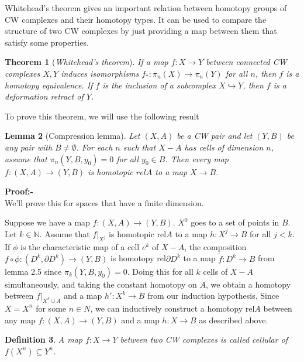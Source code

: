 \documentclass[12pt]{extarticle}
\newcounter{pic}[page]
\numberwithin{equation}{section}
\newtheorem{thm}{Theorem}[section]
\newtheorem{lem}[thm]{Lemma}
\newtheorem{defn}[thm]{Definition}
\newenvironment{Proof}[1]
    {\begin{mdframed}\textbf{#1} \\}
    {\end{mdframed}}
\newcommand{\N}{\mathbb{N}}
\begin{document}
Whitehead's theorem gives an important relation between homotopy groups of CW complexes and their homotopy types. It can be used to compare the structure of two CW complexes by just providing a map between them that satisfy some properties.\\

\begin{thm}[\emph{Whitehead's theorem}]
If a map $f:X\to Y$ between connected CW complexes $X,Y$ induces isomorphisms $f_*:\pi_n(X)\to \pi_n(Y)$ for all $n$, then $f$ is a homotopy equivalence. If $f$ is
the inclusion of a subcomplex $X\hookrightarrow Y$, then $f$ is a deformation retract of $Y$.
\end{thm}

To prove this theorem, we will use the following result

\begin{lem}[Compression lemma]
Let $(X,A)$ be a CW pair and let $(Y,B)$ be any pair with $B \neq \emptyset$. For
each $n$ such that $X-A$ has cells of dimension $n$, assume that $\pi_n(Y,B,y_0) =0$ for all $y_0\in B$. Then every map $f :(X,A)\to(Y,B)$ is homotopic $rel A$ to a map $X\to B$.
\end{lem}

\begin{Proof}{Proof:-}
We'll prove this for spaces that have a finite dimension.

Suppose we have a map $f:(X,A)\to (Y,B)$. $X^0$ goes to a set of points in $B$. Let $k\in\N$. Assume that $f|_{X^{j}}$ is homotopic rel$A$ to a map $h:X^{j}\to B$ for all $j<k$. If $\phi$ is the characteristic map of a cell $e^k$ of $X - A$, the composition
$f\circ\phi :(D^k,\partial D^k)\to(Y,B)$ is homotopy rel$\partial D^k$ to a map $\widetilde{f}:D^k\to B$ from lemma 2.5 since $\pi_k(Y,B,y_0) = 0$. Doing this for all $k$ cells of $X - A$ simultaneously, and taking the constant homotopy on $A$, we obtain a homotopy between $f|_{X^k\cup A}$ and a map $h':X^k\to B$ from our induction hypothesis. Since $X=X^n$ for some $n\in N$, we can inductively construct a homotopy rel$A$ between any map $f:(X,A)\to (Y,B)$ and a map $h:X\to B$ as described above.\\

\end{Proof}

\begin{defn}
A map $f:X\to Y$ between two CW complexes is called cellular of $f(X^n)\subseteq Y^n$.
\end{defn}
\end{document}
